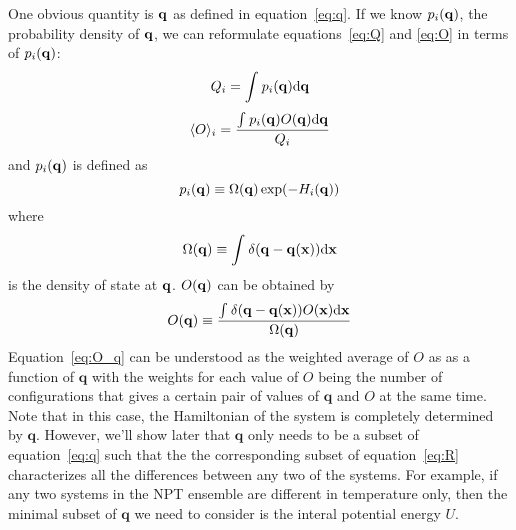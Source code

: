 One obvious quantity is $\mathbf{q}$ as defined in equation~\ref{eq:q}.
If we know $p_{i}(\mathbf{q})$, the probability density of $\mathbf{q}$, 
we can reformulate equations~\ref{eq:Q} and \ref{eq:O} in terms of 
$p_{i}(\mathbf{q})$:
\begin{equation}
Q_{i} = \int_{}^{}{p_{i}}(\mathbf{\mathbf{q}})\mathrm{d}\mathbf{\mathbf{q}}
\label{eq:Q_q}
\end{equation}
\begin{equation}
\langle O \rangle_{i} = \frac{\int_{}^{}{p_{i}(\mathbf{q})O}(\mathbf{\mathbf{q}})\mathrm{d}\mathbf{\mathbf{q}}}{Q_{i}} 
\label{eq:Oavg_q}
\end{equation}
and $p_{i}(\mathbf{q})$ is defined as
\begin{equation}
p_{i}(\mathbf{q}) \equiv \Omega(\mathbf{q}) \exp(-H_{i}(\mathbf{q})) 
\label{eq:p_q}
\end{equation}
where
\begin{equation}
\Omega(\mathbf{q}) \equiv \int_{}^{}{\delta(\mathbf{q}-\mathbf{q}(\mathbf{x}))}\mathrm{d}\mathbf{x}
\label{eq:omega}
\end{equation}
is the density of state at $\mathbf{q}$. $O(\mathbf{q})$ can be obtained by
\begin{equation}
  O(\mathbf{q}) \equiv \frac{\int_{}^{}{\delta(\mathbf{q}-\mathbf{q}(\mathbf{x}))O}(\mathbf{\mathbf{x}})\mathrm{d}\mathbf{\mathbf{x}}}{\Omega(\mathbf{q})}
\label{eq:O_q}
\end{equation}
Equation~\ref{eq:O_q} can be understood as the weighted average of $O$ as 
as a function of $\mathbf{q}$ with the weights for each value of $O$ being 
the number of configurations that gives a certain pair of values of $\mathbf{q}$
and $O$ at the same time. Note that in this case, the Hamiltonian of the system 
is completely determined by $\mathbf{q}$. However, we'll show later that 
$\mathbf{q}$ only needs to be a subset of equation~\ref{eq:q} such that the 
the corresponding subset of equation~\ref{eq:R} characterizes all the differences
between any two of the systems. For example, if any two systems in the NPT ensemble 
are different in temperature only, then the minimal subset of $\mathbf{q}$ we 
need to consider is the interal potential energy $U$.

